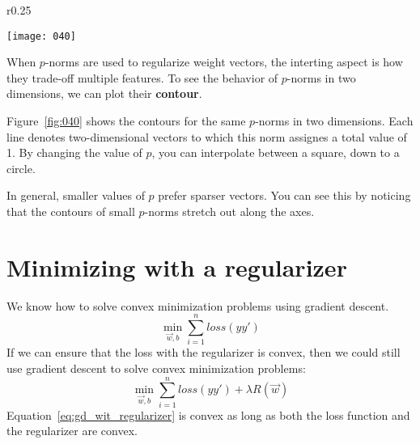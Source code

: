 \begin{wrapfigure}{r}{0.25\textwidth}
    \begin{center}
        \texttt{[image: 040]}
        \caption{\(p\)-norms visualized}
        \vspace*{-40pt}
    \end{center}
    \label{fig:040}
    \end{wrapfigure}

When \(p\)-norms are used to regularize weight vectors, the interting aspect is how they trade-off multiple features. To see the behavior of \(p\)-norms in two dimensions, we can plot their \textbf{contour}.

Figure~\ref{fig:040} shows the contours for the same \(p\)-norms in two dimensions. Each line denotes two-dimensional vectors to which this norm assignes a total value of 1. By changing the value of \(p\), you can interpolate between a square, down to a circle.

In general, smaller values of \(p\) prefer sparser vectors. You can see this by noticing that the contours of small \(p\)-norms stretch out along the axes.

\section{Minimizing with a regularizer}
We know how to solve convex minimization problems using gradient descent.
\begin{equation*}
    \min_{\vec{w},b} \sum_{i=1}^n loss(yy')
\end{equation*}
If we can ensure that the loss with the regularizer is convex, then we could still use gradient descent to solve convex minimization problems:
\begin{equation}
    \label{eq:gd_wit_regularizer}
    \min_{\vec{w},b} \sum_{i=1}^n loss(yy') + \lambda R(\vec{w})
\end{equation}
Equation~\ref{eq:gd_wit_regularizer} is convex as long as both the loss function and the regularizer are convex.


